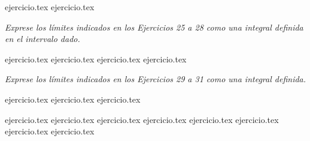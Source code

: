 \vspace{1em}
\begin{enumerate}
    \setcounter{enumi}{22}
    {ejercicio.tex}
    {ejercicio.tex}
\end{enumerate}

\vspace{1em}
\noindent \textit{Exprese los límites indicados en los Ejercicios 25 a 28 como una integral definida en el intervalo dado.}

\begin{enumerate}
    \setcounter{enumi}{24}
    {ejercicio.tex}
    {ejercicio.tex}
    {ejercicio.tex}
    {ejercicio.tex}
\end{enumerate}

\vspace{1em}
\noindent \textit{Exprese los límites indicados en los Ejercicios 29 a 31 como una integral definida.}

\begin{enumerate}
    \setcounter{enumi}{28}
    {ejercicio.tex}
    {ejercicio.tex}
    {ejercicio.tex}
\end{enumerate}

\vspace{1em}
\begin{enumerate}
    \setcounter{enumi}{31}
    {ejercicio.tex}
    {ejercicio.tex}
    {ejercicio.tex}
    {ejercicio.tex}
    {ejercicio.tex}
    {ejercicio.tex}
    {ejercicio.tex}
    {ejercicio.tex}
\end{enumerate}

